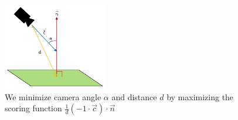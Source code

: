 \documentclass[10pt,twocolumn,letterpaper]{article}
\begin{document}
\begin{figure}
  \centering
  \includegraphics[height=1.5in]{scoringFunction.jpg}
  \caption{We minimize camera angle $\alpha$ and distance $d$ by
    maximizing the scoring function $\frac{1}{d} (-1 \cdot \vec{c})
    \cdot \vec{n}$}
  \label{fig:scoringFunction}
\end{figure}



\begin{figure}[h!]
  \centering {}

  \centering {}

  \centering {}

  \centering {}


\end{figure}
\end{document}
